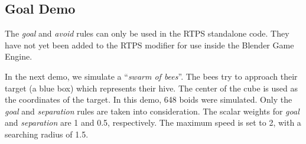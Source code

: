 \subsection{Goal Demo}
The \textit{goal} and \textit{avoid} rules can only be used in the RTPS standalone code. They have not yet been added to the RTPS modifier for use inside the Blender Game Engine. 

In the next demo, we simulate a ``\textit{swarm of bees}''. The bees try to approach their target (a blue box) which represents their hive. The center of the cube is used as the coordinates of the target. In this demo, 648 boids were simulated. Only the \textit{goal} and \textit{separation} rules are taken into consideration. The scalar weights for \textit{goal} and \textit{separation} are 1 and 0.5, respectively. The maximum speed is set to 2, with a searching radius of 1.5. 

